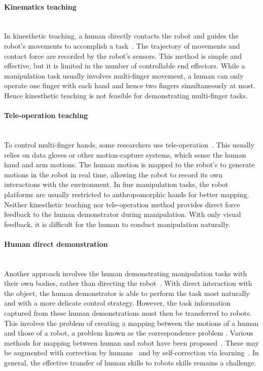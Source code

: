 \paragraph{Kinematics teaching} ~\\
In kinesthetic
teaching, a human directly contacts the robot and guides the robot's
movements to accomplish a
task~\citep{korkinof2013online,pais2014encoding,pastor2011skill,Miao2014}. The
trajectory of movements and contact force are recorded by the robot's
sensors.
This method is simple and effective, but it is limited in the number
of controllable end effectors. %
While a manipulation task usually involves multi-finger movement, a
human can only operate one finger with each hand and hence
two fingers simultaneously at most. Hence kinesthetic teaching is not feasible for demonstrating multi-finger tasks.

\paragraph{Tele-operation teaching} ~\\
To control multi-finger hands,
some researchers use
tele-operation~\citep{bernardino2013precision,kondo2008recognition,Fischer98}.
This usually relies on data gloves or other motion-capture systems, which
sense the human hand and arm motions. The human motion is mapped to
the robot's to generate motions in the robot in real time, allowing
the robot to record its own interactions with the environment.
In fine manipulation tasks, the robot platforms are usually restricted
to anthropomorphic hands for better mapping.
Neither kinesthetic teaching nor
tele-operation method provides direct force
feedback to the human demonstrator during manipulation. With only visual feedback,
it is difficult for the human to conduct manipulation naturally.

\paragraph{Human direct demonstration} ~\\
Another approach involves the human demonstrating manipulation tasks
with their own bodies, rather than directing the
robot~\citep{asfour2008imitation}. With direct interaction with the
object, the human demonstrator is able to perform the task most
naturally and with a more delicate control strategy. However, the task
information captured from these human demonstrations must then be
transferred to robots. This involves the problem of creating a mapping
between the motions of a human and those of a robot, a problem known
as the correspondence problem \citep{Nehaniv02}.
Various methods for mapping between human and
robot have been
proposed~\citep{hueser2006learning,asfour2008imitation,do2011towards}. These may be augmented with correction by humans~\citep{calinon2007incremental,sauser2011iterative,romano2011human}
and by self-correction via learning~\citep{bidan2013robio}. In general, the effective transfer of human skills to robots skills remains a challenge.


